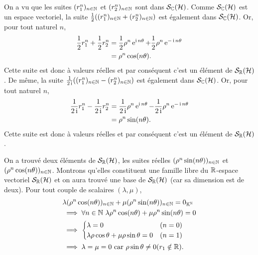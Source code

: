 On a vu que les suites \((r_1^n)_{n \in \mathbb{N}}\) et \((r_2^n)_{n \in \mathbb{N}}\) sont 
dans \(\mathcal{S}_{\mathbb{C}}(\mathcal{H})\). Comme \(\mathcal{S}_{\mathbb{C}}(\mathcal{H})\) est un espace vectoriel, la suite 
\(\frac{1}{2}((r_1^n)_{n \in \mathbb{N}} + (r_2^n)_{n \in \mathbb{N}})\) est également dans 
\(\mathcal{S}_{\mathbb{C}}(\mathcal{H})\). Or, pour tout naturel \(n\),
\begin{align}
  \frac{1}{2} r_1^n + \frac{1}{2} r_2^n & =\frac{1}{2} \rho^n \operatorname{e}^{\operatorname{i} n 
  \theta}+ \frac{1}{2} \rho^n \operatorname{e}^{-\operatorname{i} n \theta}\\
  &=\rho^n \cos(n \theta).
\end{align}
Cette suite est donc à valeurs réelles et par conséquent c'est un élément de 
\(\mathcal{S}_{\mathbb{R}}(\mathcal{H})\). De même, la suite \(\frac{1}{2\operatorname{i}}((r_1^n)_{n \in \mathbb{N}} - 
(r_2^n)_{n \in \mathbb{N}})\) est également dans \(\mathcal{S}_{\mathbb{C}}(\mathcal{H})\). Or, pour tout naturel 
\(n\),
\begin{align}
  \frac{1}{2\operatorname{i}} r_1^n - \frac{1}{2\operatorname{i}} r_2^n & =\frac{1}{2\operatorname{i}} \rho^n \operatorname{e}^{\operatorname{i} 
  n \theta}- \frac{1}{2\operatorname{i}} \rho^n \operatorname{e}^{-\operatorname{i} n \theta}\\
  &=\rho^n \sin(n \theta).
\end{align}
Cette suite est donc à valeurs réelles et par conséquent c'est un élément de 
\(\mathcal{S}_{\mathbb{R}}(\mathcal{H})\).

On a trouvé deux éléments de \(\mathcal{S}_{\mathbb{R}}(\mathcal{H})\), les suites réelles \((\rho^n 
\sin(n \theta))_{n \in \mathbb{N}}\) et \((\rho^n \cos(n \theta))_{n \in \mathbb{N}}\). 
Montrons qu'elles constituent une famille libre du \(\mathbb{R}\)-espace vectoriel 
\(\mathcal{S}_{\mathbb{R}}(\mathcal{H})\) et on aura trouvé une base de \(\mathcal{S}_{\mathbb{R}}(\mathcal{H})\) (car sa dimension 
est de deux). Pour tout couple de scalaires \((\lambda,\mu)\),
\begin{align}
  &\lambda (\rho^n \cos(n \theta))_{n \in \mathbb{N}} + \mu (\rho^n \sin(n \theta))_{n 
  \in \mathbb{N}} = 0_{\mathbb{K}^{\mathbb{N}}} \\
  &\implies \forall n \in \mathbb{N} \ \lambda \rho^n \cos(n \theta) +\mu \rho^n 
  \sin(n \theta) = 0\\
  &\implies \begin{cases} \lambda =0 & (n=0) \\ \lambda \rho \cos \theta +\mu 
  \rho \sin \theta =0 & (n=1) \end{cases}\\
  &\implies \lambda=\mu=0 \text{~car } \rho\sin \theta \neq 0 (r_1 \notin \mathbb{R}).
\end{align}

